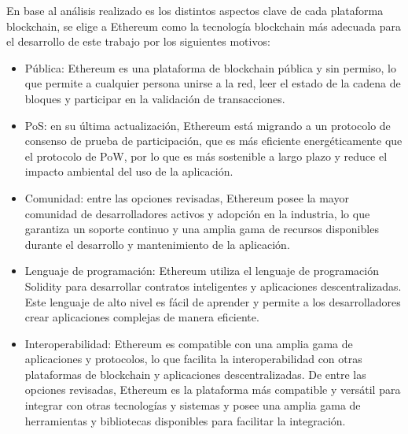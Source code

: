 \documentclass[theoretical-framework.tex]{subfiles}
\begin{document}
En base al análisis realizado es los distintos aspectos clave de cada plataforma blockchain, se elige a Ethereum como la tecnología blockchain más adecuada para el desarrollo de este trabajo por los siguientes motivos:

\begin{itemize}
	\item Pública: Ethereum es una plataforma de blockchain pública y sin permiso, lo que permite a cualquier persona unirse a la red, leer el estado de la cadena de bloques y participar en la validación de transacciones.
	\item PoS: en su última actualización, Ethereum está migrando a un protocolo de consenso de prueba de participación, que es más eficiente energéticamente que el protocolo de PoW, por lo que es más sostenible a largo plazo y reduce el impacto ambiental del uso de la aplicación.
	\item Comunidad: entre las opciones revisadas, Ethereum posee la mayor comunidad de desarrolladores activos y adopción en la industria, lo que garantiza un soporte continuo y una amplia gama de recursos disponibles durante el desarrollo y mantenimiento de la aplicación. 
	\item Lenguaje de programación: Ethereum utiliza el lenguaje de programación Solidity para desarrollar contratos inteligentes y aplicaciones descentralizadas. Este lenguaje de alto nivel es fácil de aprender y permite a los desarrolladores crear aplicaciones complejas de manera eficiente.
	\item Interoperabilidad: Ethereum es compatible con una amplia gama de aplicaciones y protocolos, lo que facilita la interoperabilidad con otras plataformas de blockchain y aplicaciones descentralizadas. De entre las opciones revisadas, Ethereum es la plataforma más compatible y versátil para integrar con otras tecnologías y sistemas y posee una amplia gama de herramientas y bibliotecas disponibles para facilitar la integración.
\end{itemize}
\end{document}
